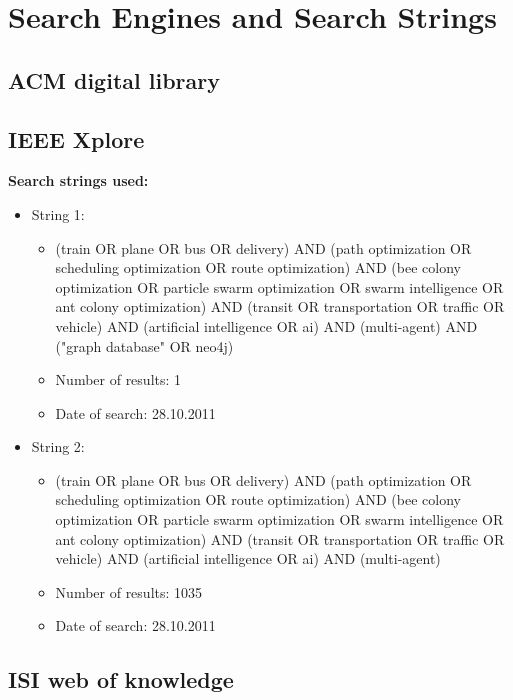 \chapter{Search Engines and Search Strings}

\section{ACM digital library}


\section{IEEE Xplore}

\textbf{Search strings used:}
\begin{itemize}
\item String 1:
\begin{itemize}
\item (train OR plane OR bus OR delivery) AND (path optimization OR scheduling optimization OR route optimization) AND (bee colony optimization OR particle swarm optimization OR swarm intelligence OR ant colony optimization) AND (transit OR transportation OR traffic OR vehicle) AND (artificial intelligence OR ai) AND (multi-agent) AND ("graph database" OR neo4j)
\item Number of results: 1
\item Date of search: 28.10.2011
\end{itemize}
\item String 2:
\begin{itemize}
\item (train OR plane OR bus OR delivery) AND (path optimization OR scheduling optimization OR route optimization) AND (bee colony optimization OR particle swarm optimization OR swarm intelligence OR ant colony optimization) AND (transit OR transportation OR traffic OR vehicle) AND (artificial intelligence OR ai) AND (multi-agent)
\item Number of results: 1035
\item Date of search: 28.10.2011
\end{itemize}
\end{itemize}

\section{ISI web of knowledge}

